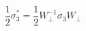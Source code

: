 \begin{equation}
\frac{1}{2} \sigma_{3}^{''} = \frac{1}{2} W_{\perp}^{-1} \sigma_{3} W_{\perp} 
\end{equation}

